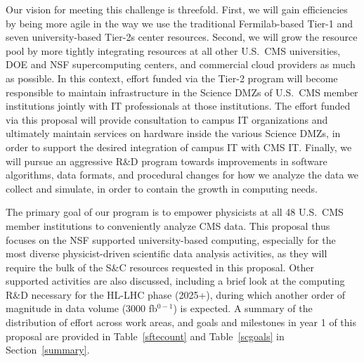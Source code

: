 \documentclass[11pt,a4paper]{article}
\begin{document}
Our vision for meeting this challenge 
is threefold. First, we will gain efficiencies by being  more
agile in the way we use the traditional Fermilab-based Tier-1 and seven
university-based Tier-2s center resources. Second, we will grow the
resource pool by more tightly integrating resources at all other
U.S.~CMS universities, DOE and NSF supercomputing centers, and
commercial cloud providers as much as possible. 
In this
context, effort funded via the Tier-2 program will become responsible to
maintain infrastructure in the Science DMZs of U.S.~CMS member institutions
jointly with IT professionals at those institutions.  The effort funded via
this proposal will provide consultation to campus IT organizations and
ultimately maintain services on hardware inside the various Science DMZs,
in order to support the desired integration of campus IT with CMS IT.
Finally, we will
pursue an aggressive R\&D program towards improvements in software
algorithms, data formats, and procedural changes for how we analyze
the data we collect and simulate, in order to contain the growth in
computing needs.





The primary goal of our program is to empower physicists at all 48 U.S.~CMS
member institutions to conveniently analyze CMS data. 
This proposal thus focuses on the NSF supported university-based computing,
especially for the most diverse %
physicist-driven scientific data analysis activities, as they will require
the bulk of the S\&C resources requested in this proposal.  Other supported
activities are also discussed, including a brief look at the
computing R\&D necessary for the HL-LHC phase (2025+), during which another
order of magnitude in data volume (3000 fb$^{0-1}$) is expected.
A summary of the distribution of effort across work areas, and goals and milestones in year 1 of this proposal
are provided in Table~\ref{sftecount} and Table~\ref{scgoals} in Section~\ref{summary}.
\end{document}
